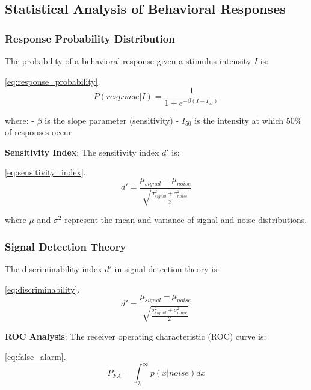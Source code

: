 \documentclass[
  13pt,
  a4paperpaper,
  12pt]{article}
\begin{document}
\subsection{Statistical Analysis of Behavioral
Responses}\label{statistical-analysis-of-behavioral-responses}

\subsubsection{Response Probability
Distribution}\label{response-probability-distribution}

The probability of a behavioral response given a stimulus intensity
\(I\) is:

\eqref{eq:response_probability}. \begin{equation}
P(response|I) = \frac{1}{1 + e^{-\beta(I - I_{50})}} \label{eq:response_probability}
\end{equation}

where: - \(\beta\) is the slope parameter (sensitivity) - \(I_{50}\) is
the intensity at which 50\% of responses occur

\textbf{Sensitivity Index}: The sensitivity index \(d'\) is:

\eqref{eq:sensitivity_index}. \begin{equation}
d' = \frac{\mu_{signal} - \mu_{noise}}{\sqrt{\frac{\sigma_{signal}^2 + \sigma_{noise}^2}{2}}} \label{eq:sensitivity_index}
\end{equation}

where \(\mu\) and \(\sigma^2\) represent the mean and variance of signal
and noise distributions.

\subsubsection{Signal Detection Theory}\label{signal-detection-theory}

The discriminability index \(d'\) in signal detection theory is:

\eqref{eq:discriminability}. \begin{equation}
d' = \frac{\mu_{signal} - \mu_{noise}}{\sqrt{\frac{\sigma_{signal}^2 + \sigma_{noise}^2}{2}}} \label{eq:discriminability}
\end{equation}

\textbf{ROC Analysis}: The receiver operating characteristic (ROC) curve
is:

\eqref{eq:false_alarm}. \begin{equation}
P_{FA} = \int_{\lambda}^{\infty} p(x|noise) dx \label{eq:false_alarm}
\end{equation}
\end{document}
